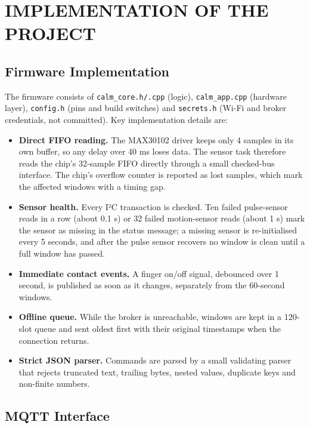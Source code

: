 \documentclass[12pt,letterpaper,oneside]{report}
\begin{document}
\chapter{IMPLEMENTATION OF THE PROJECT}\label{ch:5}

\section{Firmware Implementation}\label{sec:5.1}

The firmware consists of \texttt{calm\_\allowbreak{}core.h/\allowbreak{}.cpp} (logic), \texttt{calm\_\allowbreak{}app.cpp} (hardware layer), \texttt{config.h} (pins and build switches) and \texttt{secrets.h} (Wi-Fi and broker credentials, not committed). Key implementation details are:


\begin{itemize}\item \textbf{Direct FIFO reading.} The MAX30102 driver keeps only 4 samples in its own buffer, so any delay over 40 ms loses data. The sensor task therefore reads the chip's 32-sample FIFO directly through a small checked-bus interface. The chip's overflow counter is reported as lost samples, which mark the affected windows with a timing gap.
\item \textbf{Sensor health.} Every I²C transaction is checked. Ten failed pulse-sensor reads in a row (about 0.1 s) or 32 failed motion-sensor reads (about 1 s) mark the sensor as missing in the status message; a missing sensor is re-initialised every 5 seconds, and after the pulse sensor recovers no window is clean until a full window has passed.
\item \textbf{Immediate contact events.} A finger on/off signal, debounced over 1 second, is published as soon as it changes, separately from the 60-second windows.
\item \textbf{Offline queue.} While the broker is unreachable, windows are kept in a 120-slot queue and sent oldest first with their original timestamps when the connection returns.
\item \textbf{Strict JSON parser.} Commands are parsed by a small validating parser that rejects truncated text, trailing bytes, nested values, duplicate keys and non-finite numbers.
\end{itemize}

\section{MQTT Interface}\label{sec:5.2}
\end{document}

